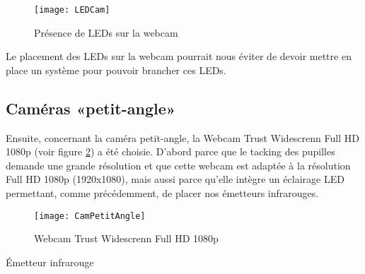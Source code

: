 \begin{figure}[H]
  \centering
  \texttt{[image: LEDCam]}
  \caption{Présence de LEDs sur la webcam}
  \label{fig:LEDCam}
\end{figure}

Le placement des LEDs sur la webcam pourrait nous éviter de devoir mettre en place un système pour pouvoir brancher ces LEDs.


\subsection{Caméras «petit-angle»}

Ensuite, concernant la caméra petit-angle, la Webcam Trust Widescrenn Full HD 1080p (voir figure \ref{fig:CamPetitAngle}) a été choisie. D'abord parce que le tacking des pupilles demande une grande résolution et que cette webcam est adaptée à la résolution Full HD 1080p (1920x1080), mais aussi parce qu'elle intègre un éclairage LED permettant, comme précédemment, de placer nos émetteurs infrarouges.

\begin{figure}[H]
  \centering
  \texttt{[image: CamPetitAngle]}
  \caption{Webcam Trust Widescrenn Full HD 1080p}
  \label{fig:CamPetitAngle}
\end{figure}Émetteur infrarouge



